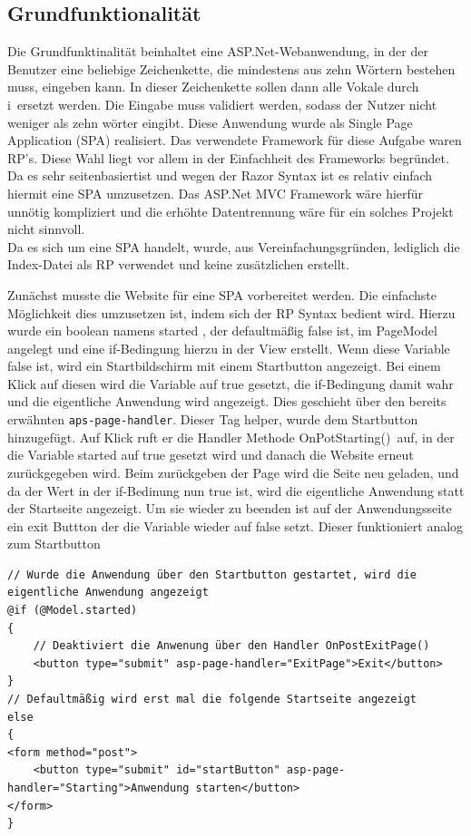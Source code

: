 \documentclass[a4paper,
12pt,
oneside]
{article}
\newcommand{\sPar}{\par\vspace*{6pt}}
\begin{document}
	\subsection{Grundfunktionalität}
	Die Grundfunktinalität beinhaltet eine ASP.Net-Webanwendung, in der der Benutzer eine beliebige Zeichenkette, die mindestens aus zehn Wörtern bestehen muss, eingeben kann. In dieser Zeichenkette sollen dann alle Vokale durch \glqq i\grqq~ersetzt werden. Die Eingabe muss validiert werden, sodass der Nutzer nicht weniger als zehn wörter eingibt. Diese Anwendung wurde als Single Page Application (SPA) realisiert. Das verwendete Framework für diese Aufgabe waren RP's. Diese Wahl liegt vor allem in der Einfachheit des Frameworks begründet. Da es sehr \glqq seitenbasiert\grqq ist und wegen der Razor Syntax ist es relativ einfach hiermit eine SPA umzusetzen. Das ASP.Net MVC Framework wäre hierfür unnötig kompliziert und die erhöhte Datentrennung wäre für ein solches Projekt nicht sinnvoll. \\
	Da es sich um eine SPA handelt, wurde, aus Vereinfachungsgründen, lediglich die Index-Datei als RP verwendet und keine zusätzlichen erstellt. \sPar
	Zunächst musste die Website für eine SPA vorbereitet werden. Die einfachste Möglichkeit dies umzusetzen ist, indem sich der RP Syntax bedient wird. Hierzu wurde ein boolean namens \glqq started \grqq, der defaultmäßig false ist, im PageModel angelegt und eine if-Bedingung hierzu in der View erstellt. Wenn diese Variable false ist, wird ein Startbildschirm mit einem Startbutton angezeigt. Bei einem Klick auf diesen wird die Variable auf true gesetzt, die if-Bedingung damit wahr und die eigentliche Anwendung wird angezeigt. Dies geschieht über den bereits erwähnten \texttt{aps-page-handler}. Dieser Tag helper, wurde dem Startbutton hinzugefügt. Auf Klick ruft er die Handler Methode \glqq OnPotStarting()\grqq~auf, in der die Variable started auf true gesetzt wird und danach die Website erneut zurückgegeben wird. Beim zurückgeben der Page wird die Seite neu geladen, und da der Wert in der if-Bedinung nun true ist, wird die eigentliche Anwendung statt der Startseite angezeigt. Um sie wieder zu beenden ist auf der Anwendungsseite ein exit Buttton der die Variable wieder auf false setzt. Dieser funktioniert analog zum Startbutton
	\lstset{style=csharp}
	\begin{lstlisting}
// Wurde die Anwendung über den Startbutton gestartet, wird die eigentliche Anwendung angezeigt
@if (@Model.started)
{
	// Deaktiviert die Anwenung über den Handler OnPostExitPage()
	<button type="submit" asp-page-handler="ExitPage">Exit</button>
}
// Defaultmäßig wird erst mal die folgende Startseite angezeigt
else
{
<form method="post">
	<button type="submit" id="startButton" asp-page-handler="Starting">Anwendung starten</button>
</form>
}
	\end{lstlisting}
\end{document}
